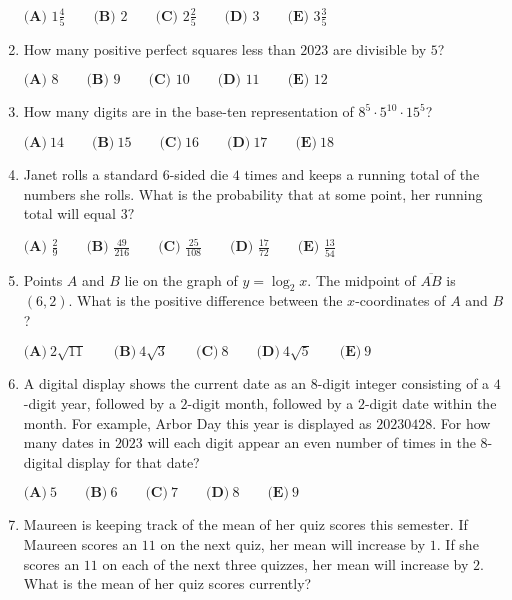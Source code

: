 \documentclass{article}
\begin{document}
\begin{enumerate}[label=\arabic*., itemsep=0.5em]
\(\textbf{(A) }1\frac{4}{5}\qquad\textbf{(B) }2\qquad\textbf{(C) }2\frac{2}{5}\qquad\textbf{(D) }3\qquad\textbf{(E) }3\frac{3}{5}\)\par \vspace{0.5em}\item How many positive perfect squares less than \(2023\) are divisible by \(5\)?

\(\textbf{(A) }8\qquad\textbf{(B) }9\qquad\textbf{(C) }10\qquad\textbf{(D) }11\qquad\textbf{(E) }12\)\par \vspace{0.5em}\item How many digits are in the base-ten representation of \(8^5 \cdot 5^{10} \cdot 15^5\)?

\(\textbf{(A)}~14\qquad\textbf{(B)}~15\qquad\textbf{(C)}~16\qquad\textbf{(D)}~17\qquad\textbf{(E)}~18\qquad\)\par \vspace{0.5em}\item Janet rolls a standard \(6\)-sided die \(4\) times and keeps a running total of the numbers she rolls. What is the probability that at some point, her running total will equal \(3?\)

\(\textbf{(A) }\frac{2}{9}\qquad\textbf{(B) }\frac{49}{216}\qquad\textbf{(C) }\frac{25}{108}\qquad\textbf{(D) }\frac{17}{72}\qquad\textbf{(E) }\frac{13}{54}\)\par \vspace{0.5em}\item Points \(A\) and \(B\) lie on the graph of \(y=\log_{2}x\). The midpoint of \(\overline{AB}\) is \((6, 2)\). What is the positive difference between the \(x\)-coordinates of \(A\) and \(B\)?

\(\textbf{(A)}~2\sqrt{11}\qquad\textbf{(B)}~4\sqrt{3}\qquad\textbf{(C)}~8\qquad\textbf{(D)}~4\sqrt{5}\qquad\textbf{(E)}~9\)\par \vspace{0.5em}\item A digital display shows the current date as an \(8\)-digit integer consisting of a \(4\)-digit year, followed by a \(2\)-digit month, followed by a \(2\)-digit date within the month. For example, Arbor Day this year is displayed as \(20230428\). For how many dates in \(2023\) will each digit appear an even number of times in the 8-digital display for that date?

\(\textbf{(A)}~5\qquad\textbf{(B)}~6\qquad\textbf{(C)}~7\qquad\textbf{(D)}~8\qquad\textbf{(E)}~9\)\par \vspace{0.5em}\item Maureen is keeping track of the mean of her quiz scores this semester. If Maureen scores an \(11\) on the next quiz, her mean will increase by \(1\). If she scores an \(11\) on each of the next three quizzes, her mean will increase by \(2\). What is the mean of her quiz scores currently?


\end{enumerate}
\end{document}
